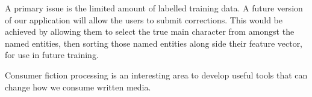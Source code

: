 \documentclass[11pt,a4paper]{article}
\begin{document}
A primary issue is the limited amount of labelled training data.
A future version of our application will allow the users to submit corrections.
This would be achieved by allowing them to select the true main character from amongst the named entities,
then sorting those named entities along side their feature vector,
for use in future training.



Consumer fiction processing is an interesting area to develop useful tools that can change how we consume written media.


\end{document}
